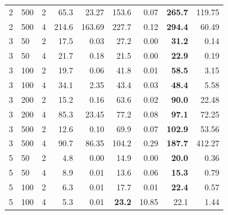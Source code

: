 \documentclass[runningheads]{llncs}
\begin{document}
\begin{table}[!ht]
{\begin{tabular}{lll|rr|rr|rr}
			2 &      500 &         2 &            65.3 &        23.27 &                    153.6 &                  0.07 &        \textbf{265.7} &    119.75 \\
			2 &      500 &         4 &           214.6 &       163.69 &                    227.7 &                  0.12 &        \textbf{294.4} &     60.49 \\ \hline
			3 &       50 &         2 &            17.5 &         0.03 &                     27.2 &                  0.00 &         \textbf{31.2} &      0.14 \\
			3 &       50 &         4 &            21.7 &         0.18 &                     21.5 &                  0.00 &         \textbf{22.9} &      0.19 \\
			3 &      100 &         2 &            19.7 &         0.06 &                     41.8 &                  0.01 &         \textbf{58.5} &      3.15 \\
			3 &      100 &         4 &            34.1 &         2.35 &                     43.4 &                  0.03 &         \textbf{48.4} &      5.58 \\
			3 &      200 &         2 &            15.2 &         0.16 &                     63.6 &                  0.02 &         \textbf{90.0} &     22.48 \\
			3 &      200 &         4 &            85.3 &        23.45 &                     77.2 &                  0.08 &         \textbf{97.1} &     72.25 \\
			3 &      500 &         2 &            12.6 &         0.10 &                     69.9 &                  0.07 &        \textbf{102.9} &     53.56 \\
			3 &      500 &         4 &            90.7 &        86.35 &                    104.2 &                  0.29 &        \textbf{187.7} &    412.27 \\ \hline
			5 &       50 &         2 &             4.8 &         0.00 &                     14.9 &                  0.00 &         \textbf{20.0} &      0.36 \\
			5 &       50 &         4 &             8.9 &         0.01 &                     13.6 &                  0.06 &         \textbf{15.3} &      0.79 \\
			5 &      100 &         2 &             6.3 &         0.01 &                     17.7 &                  0.01 &         \textbf{22.4} &      0.57 \\
			5 &      100 &         4 &             5.3 &         0.01 &                     \textbf{23.2} &                 10.85 &         22.1 &      1.44 \\

\end{tabular}}
\end{table}
\end{document}
